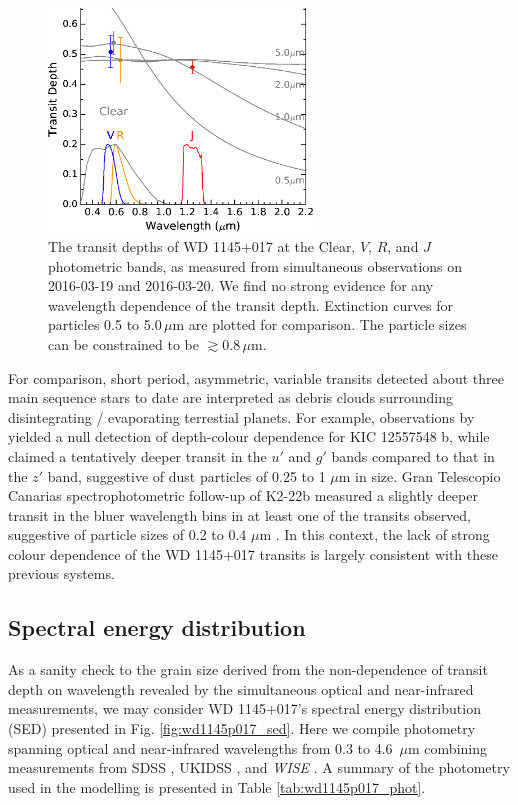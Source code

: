 \documentclass[apj]{emulateapj}
\begin{document}
\begin{figure}
    \vspace{5mm}
    \centering
    \includegraphics[width=7cm]{plots/band_depth.eps}
    \caption{The transit depths of WD 1145+017 at the Clear, $V$, $R$, and $J$ photometric bands, as measured from simultaneous observations on 2016-03-19 and 2016-03-20. We find no strong evidence for any wavelength dependence of the transit depth. Extinction curves for particles 0.5 to 5.0\,$\mu$m are plotted for comparison. The particle sizes can be constrained to be $\gtrsim 0.8\,\mu$m.}
    \label{fig:band_depth}
\end{figure}

For comparison, short period, asymmetric, variable transits detected about three main sequence stars to date \citep{2012ApJ...752....1R,2014ApJ...784...40R,2015ApJ...812..112S} are interpreted as debris clouds surrounding disintegrating / evaporating terrestial planets. For example, observations by \citet{2014ApJ...786..100C} yielded a null detection of depth-colour dependence for KIC 12557548 b, while \citet{2015ApJ...800L..21B} claimed a tentatively deeper transit in the $u'$ and $g'$ bands compared to that in the $z'$ band, suggestive of dust particles of 0.25 to 1 $\mu$m in size. Gran Telescopio Canarias spectrophotometric follow-up of K2-22b measured a slightly deeper transit in the bluer wavelength bins in at least one of the transits observed, suggestive of particle sizes of 0.2 to 0.4 $\mu$m \citep{2015ApJ...812..112S}. In this context, the lack of strong colour dependence of the WD 1145+017 transits is largely consistent with these previous systems.

\subsection{Spectral energy distribution}

As a sanity check to the grain size derived from the non-dependence of transit depth on wavelength revealed by the simultaneous optical and near-infrared measurements, we may consider WD 1145+017's spectral energy distribution (SED) presented in Fig. \ref{fig:wd1145p017_sed}. Here we compile photometry spanning optical and near-infrared wavelengths from 0.3 to 4.6~$\mu$m combining measurements from SDSS \citep[$ugriz$;][]{2011ApJS..193...29A}, UKIDSS \citep[$YJHK$;][]{2007MNRAS.379.1599L}, and \textit{WISE} \citep[W1 and W2 -- W3 and W4 upper limits do not constrain the SED;][]{2010AJ....140.1868W}. A summary of the photometry used in the modelling is presented in Table \ref{tab:wd1145p017_phot}. 
\end{document}
